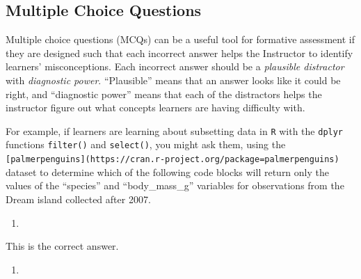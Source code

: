 \documentclass[]{book}
\newenvironment{Shaded}{\begin{snugshade}}{\end{snugshade}}
\newcommand{\DecValTok}[1]{\textcolor[rgb]{0.00,0.00,0.81}{#1}}
\newcommand{\KeywordTok}[1]{\textcolor[rgb]{0.13,0.29,0.53}{\textbf{#1}}}
\newcommand{\NormalTok}[1]{#1}
\newcommand{\OperatorTok}[1]{\textcolor[rgb]{0.81,0.36,0.00}{\textbf{#1}}}
\newcommand{\StringTok}[1]{\textcolor[rgb]{0.31,0.60,0.02}{#1}}
\begin{document}
\hypertarget{multiple-choice-questions}{%
\subsection{Multiple Choice Questions}\label{multiple-choice-questions}}

Multiple choice questions (MCQs) can be a useful tool for formative assessment if they are
designed such that each incorrect answer helps the Instructor to identify learners'
misconceptions. Each incorrect answer should be a \emph{plausible distractor} with \emph{diagnostic power}.
``Plausible'' means that an answer looks like it could be right, and ``diagnostic power'' means
that each of the distractors helps the instructor figure out
what concepts learners are having difficulty with.

For example, if learners are learning about subsetting data in \texttt{R} with the \texttt{dplyr}
functions \texttt{filter()} and \texttt{select()}, you might ask them, using the \texttt{{[}palmerpenguins{]}(https://cran.r-project.org/package=palmerpenguins)} dataset to determine which of the
following code blocks will return only the values of the ``species'' and ``body\_mass\_g'' variables
for observations from the Dream island collected after 2007.

\begin{enumerate}
\def\labelenumi{\alph{enumi}.}
\item
\end{enumerate}

\begin{Shaded}
\end{Shaded}

This is the correct answer.

\begin{enumerate}
\def\labelenumi{\alph{enumi}.}
\setcounter{enumi}{1}
\item
\end{enumerate}

\begin{Shaded}
\end{Shaded}
\end{document}
